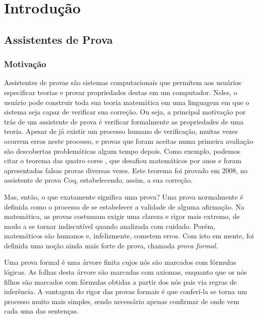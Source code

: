 \chapter{Introdução}

\section{Assistentes de Prova} 
\subsection{Motivação}

Assistentes de provas são sistemas computacionais que permitem aos usuários
especificar teorias e provar propriedades destas em um computador. Neles, o
usuário pode construir toda sua teoria matemática em uma linguagem em que o
sistema seja capaz de verificar sua correção. Ou seja, a principal motivação por
trás de um assistente de prova é verificar formalmente as propriedades de uma
teoria. Apesar de já existir um processo humano de verificação, muitas vezes
ocorrem erros neste processo, e provas que foram aceitas numa primeira avaliação
são descobertas problemáticas algum tempo depois. Como exemplo, podemos citar o
teorema das quatro cores \cite{four_colour}, que desafiou matemáticos por anos e
foram apresentadas falsas provas diversas vezes. Este teorema foi provado em
2008, no assistente de prova  Coq, estabelecendo, assim, a sua correção.
\cite{4colproof, gonthieril:_four_colour_theor}

Mas, então, o que exatamente significa uma prova? Uma prova normalmente é
definida como o processo de se estabelecer a validade de alguma afirmação. Na
matemática, as provas costumam exigir uma clareza e rigor mais extremo, de modo
a se tornar indiscutível quando analizada com cuidado. Porém, matemáticos são
humanos e, infelizmente, cometem erros. Com isto em mente, foi definida uma
noção ainda mais forte de prova, chamada \emph{prova formal}.

Uma prova formal é uma árvore finita cujos nós são marcados com fórmulas
lógicas. As folhas desta árvore são marcadas com axiomas, enquanto que os nós
filhos são marcados com fórmulas obtidas a partir dos nós pais via regras de
inferência. A vantagem do rigor das provas formais é que conferí-la se torna um
processo muito mais simples, sendo necessário apenas confirmar de onde vem cada
uma das sentenças.

